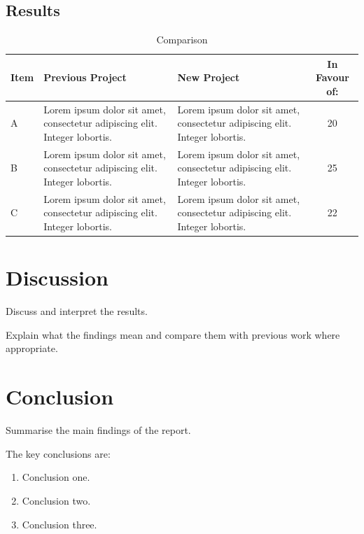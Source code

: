 \documentclass[12pt,a4paper]{report}
\begin{document}
\section{Results}

\begin{table}[H]
    \centering
    \caption{Comparison}
    \label{tab:results}
    \begin{tabular}{lp{3cm}p{3cm}c}
        \toprule
        Item & Previous Project & New Project & In Favour of:    \\
        \midrule
        A & Lorem ipsum dolor sit amet, consectetur adipiscing elit. Integer lobortis. & Lorem ipsum dolor sit amet, consectetur adipiscing elit. Integer lobortis. & 20   \\
        B & Lorem ipsum dolor sit amet, consectetur adipiscing elit. Integer lobortis. & Lorem ipsum dolor sit amet, consectetur adipiscing elit. Integer lobortis. & 25   \\
        C & Lorem ipsum dolor sit amet, consectetur adipiscing elit. Integer lobortis. & Lorem ipsum dolor sit amet, consectetur adipiscing elit. Integer lobortis. & 22   \\
        \bottomrule
    \end{tabular}
\end{table}

\chapter{Discussion}

Discuss and interpret the results.

Explain what the findings mean and compare them with
previous work where appropriate.

\chapter{Conclusion}

Summarise the main findings of the report.

The key conclusions are:

\begin{enumerate}
    \item Conclusion one.
    \item Conclusion two.
    \item Conclusion three.
\end{enumerate}
\end{document}
